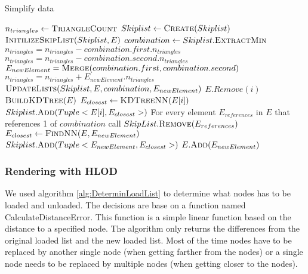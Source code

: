 \begin{algorithm}[h]
\caption{Simplify data}\label{alg:SimplifyData}
\begin{algorithmic}[1]
 
\State {}
\State $n_{triangles} \gets \Call{TriangleCount}{}$
\State $Skiplist \gets \Call{Create}{Skiplist}$ 
\State $\Call{InitilizeSkipList}{Skiplist, E}$
    \State $combination \gets Skiplist.\Call{ExtractMin}{}$
    \State $n_{triangles} = n_{triangles} - combination.first.n_{triangles}$
    \State $n_{triangles} = n_{triangles} - combination.second.n_{triangles}$
    \State $E_{newElement} = \Call{Merge}{combination.first, combination.second}$
    \State $n_{triangles} = n_{triangles} + E_{newElement}.n_{triangles}$
    \State $\Call{UpdateLists}{Skiplist, E, combination, E_{newElement}}$
\EndWhile
\EndProcedure
{}
        \State $E.Remove(i)$
    \EndIf
\EndFor
\EndFunction
{}
\State $\Call{BuildKDTree}{E}$
    \State $E_{closest} \gets \Call{KDTreeNN}{E[i]}$ 
    \State $Skiplist.\Call{Add}{Tuple<E[i], E_{closest}>}$
\EndFor
\EndFunction
{}
\State For every element $E_{references}$ in $E$ that references 1 of $combination$ call $SkipList.\Call{Remove}{E_{references}}$
\State $E_{closest} \gets \Call{FindNN}{E, E_{newElement}}$ 
\State $Skiplist.\Call{Add}{Tuple<E_{newElement}, E_{closest}>}$
\State $E.\Call{Add}{E_{newElement}}$
\EndFunction
\end{algorithmic}
\end{algorithm}

\subsubsection{Rendering with HLOD}
We used algorithm \ref{alg:DeterminLoadList} to determine what nodes has to be loaded and unloaded. The decisions are base on a function named CalculateDistanceError. This function is a simple linear function based on the distance to a specified node. The algorithm only returns the differences from the original loaded list and the new loaded list. Most of the time nodes have to be replaced by another single node (when getting farther from the nodes) or a single node needs to be replaced by multiple nodes (when getting closer to the nodes).

